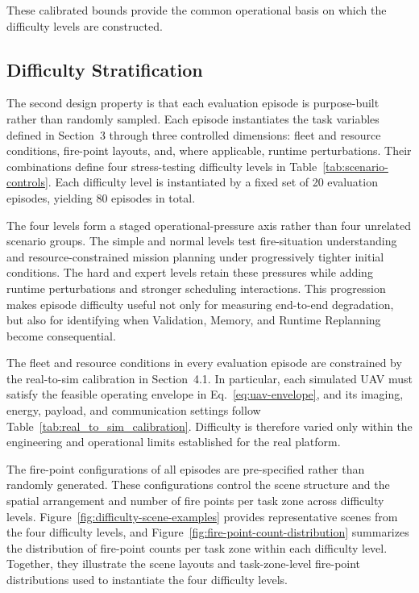 

These calibrated bounds provide the common operational basis on which the
difficulty levels are constructed.

\subsection{Difficulty Stratification}
The second design property is that each evaluation episode is purpose-built
rather than randomly sampled.
Each episode instantiates the task variables defined in Section~3 through three
controlled dimensions: fleet and resource conditions, fire-point layouts, and,
where applicable, runtime perturbations. Their combinations define four
stress-testing difficulty levels in Table~\ref{tab:scenario-controls}. Each
difficulty level is instantiated by a fixed set of 20 evaluation episodes,
yielding 80 episodes in total.

The four levels form a staged operational-pressure axis rather than four
unrelated scenario groups. The simple and normal levels test fire-situation
understanding and resource-constrained mission planning under progressively
tighter initial conditions. The hard and expert levels retain these pressures
while adding runtime perturbations and stronger scheduling interactions. This
progression makes episode difficulty useful not only for measuring end-to-end
degradation, but also for identifying when Validation, Memory, and Runtime
Replanning become consequential.



The fleet and resource conditions in every evaluation episode are constrained by the
real-to-sim calibration in Section~4.1. In particular, each simulated UAV must
satisfy the feasible operating envelope in Eq.~\ref{eq:uav-envelope}, and its
imaging, energy, payload, and communication settings follow
Table~\ref{tab:real_to_sim_calibration}. Difficulty is therefore varied only
within the engineering and operational limits established for the real platform.

The fire-point configurations of all episodes are pre-specified rather than
randomly generated. These configurations control the scene structure
and the spatial arrangement and number of fire points per task zone across
difficulty levels.
Figure~\ref{fig:difficulty-scene-examples} provides representative scenes from
the four difficulty levels, and Figure~\ref{fig:fire-point-count-distribution} summarizes
the distribution of fire-point counts per task zone within each difficulty level. Together,
they illustrate the scene layouts and task-zone-level fire-point distributions
used to instantiate the four difficulty levels.

